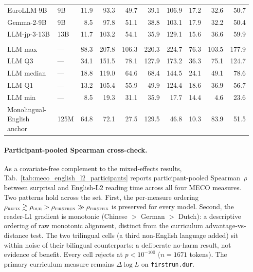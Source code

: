 \begin{table}[t]
\begin{tabular}{@{}llrrrrrrrr@{}}
    \quad EuroLLM-9B & 9B & 11.9 & 93.3 & 49.7 & 39.1 & 106.9 & 17.2 & 32.6 & 50.7 \\
    \quad Gemma-2-9B & 9B & 8.5 & 97.8 & 51.1 & 38.8 & 103.1 & 17.9 & 32.2 & 50.4 \\
    \quad LLM-jp-3-13B & 13B & 11.7 & 103.2 & 54.1 & 35.9 & 129.1 & 15.6 & 36.6 & 59.9 \\
    \addlinespace[2pt]
    \multicolumn{10}{@{}l}{\emph{LLM distribution (box summary)}} \\
    \quad LLM max & --- & 88.3 & 207.8 & 106.3 & 220.3 & 224.7 & 76.3 & 103.5 & 177.9 \\
    \quad LLM Q3 & --- & 34.1 & 151.5 & 78.1 & 127.9 & 173.2 & 36.3 & 75.1 & 124.7 \\
    \quad LLM median & --- & 18.8 & 119.0 & 64.6 & 68.4 & 144.5 & 24.1 & 49.1 & 78.6 \\
    \quad LLM Q1 & --- & 13.2 & 105.4 & 55.9 & 49.9 & 124.4 & 18.6 & 36.9 & 56.7 \\
    \quad LLM min & --- & 8.5 & 19.3 & 31.1 & 35.9 & 17.7 & 14.4 & 4.6 & 23.6 \\
    \midrule
    Monolingual-English anchor & 125M & 64.8 & 72.1 & 27.5 & 129.5 & 46.8 & 10.3 & 83.9 & 51.5 \\
    \bottomrule
  \end{tabular}
\end{table}

\paragraph{Participant-pooled Spearman cross-check.} As a covariate-free complement to the mixed-effects results, Tab.~\ref{tab:meco_english_l2_participants} reports participant-pooled Spearman~$\rho$ between \beetle{} surprisal and English-L2 reading time across all four MECO measures. Two patterns hold across the set. First, the per-measure ordering $\rho_\textsc{refix} \gtrsim \rho_\textsc{dur} > \rho_\textsc{firstrun} \gg \rho_\textsc{firstfix}$ is preserved for every model. Second, the reader-L1 gradient is monotonic (Chinese $>$ German $>$ Dutch): a descriptive ordering of raw monotonic alignment, distinct from the curriculum advantage-vs-distance test. The two trilingual cells (a third non-English language added) sit within noise of their bilingual counterparts: a deliberate no-harm result, not evidence of benefit. Every cell rejects at $p<10^{-100}$ ($n=1671$ tokens). The primary curriculum measure remains $\Delta\log L$ on \texttt{firstrun.dur}.
 
